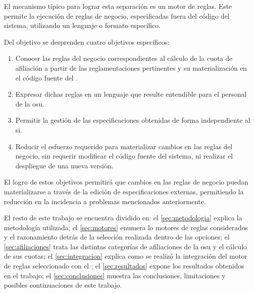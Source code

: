 El mecanismo típico para lograr esta separación es un motor de reglas. 
Este permite la ejecución de reglas de negocio, especificadas fuera del código del sistema, utilizando un lenguaje o formato específico.


Del objetivo se desprenden cuatro objetivos específicos:
\begin{enumerate}
    \item \label{obj:esp:extraer}
    Conocer las reglas del negocio correspondientes al cálculo de la cuota de afiliación a partir de las reglamentaciones pertinentes y su materialización en el código fuente del {\SIDOSPU}.
    \item \label{obj:esp:intelegible}
    Expresar dichas reglas en un lenguaje que resulte entendible para el personal de la \acrlong{osu}.
    \item \label{obj:esp:independiente}
    Permitir la gestión de las especificaciones obtenidas de forma independiente al \acrshort{si}.
    \item \label{obj:esp:esfuerzo}
    Reducir el esfuerzo requerido para materializar cambios en las reglas del negocio, sin requerir modificar el código fuente del sistema, ni realizar el despliegue de una nueva versión.
\end{enumerate}

El logro de estos objetivos permitirá que cambios en las reglas de negocio puedan materializarse a través de la edición de especificaciones externas,  permitiendo la reducción en la incidencia a problemas mencionados anteriormente.




El resto de este trabajo se encuentra dividido en:
el \cref{sec:metodologia} explica la metodología utilizada; 
el \cref{sec:motores} enumera lo motores de reglas considerados y el razonamiento detrás de la selección realizada dentro de las opciones;
el \cref{sec:afiliaciones} trata las distintas categorías de afiliaciones de la \acrshort{osu} y el cálculo de sus cuotas;
el \cref{sec:integracion} explica como se realizó la integración del motor de reglas seleccionado con el {\SIOSU};
el \cref{sec:resultados} expone los resultados obtenidos en el trabajo;
el \cref{sec:conclusiones} muestra las conclusiones, limitaciones y posibles continuaciones de este trabajo.